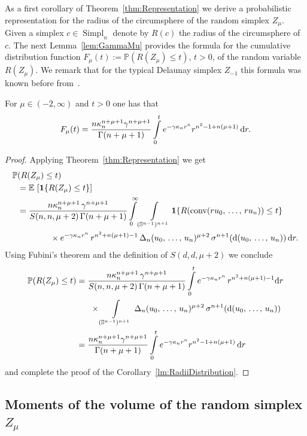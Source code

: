 \documentclass[10pt]{amsart}
\theoremstyle{definition}\newtheorem{defi}[theo]{Definition}\newtheorem{rema}[theo]{Remark}\newtheorem{exam}[theo]{Example}\newtheorem{exem}[theo]{Example}\newtheorem{nota}[theo]{Notation}
\newcommand{\Sp}{\mathbb S}
\newcommand{\EE}{\mathbb{E}\,}
\newcommand{\PP}{\mathbb{P}}
\newcommand{\dd}{{\rm d}}
\DeclareMathOperator{\Simpl}{Simpl}
\newcommand{\conv}{\mathop{\mathrm{conv}}\nolimits}
\begin{document}
As a first corollary of Theorem~\ref{thm:Representation} we derive a probabilistic representation for the radius of the circumsphere of the random simplex $Z_{\mu}$. Given a simplex $c\in \Simpl_n$ denote by $R(c)$ the radius of the circumsphere of $c$. The next Lemma~\ref{lem:GammaMu} provides the formula for the cumulative distribution function $F_{\mu}(t):=\PP(R(Z_\mu)\leq t)$, $t> 0$, of the random variable $R(Z_\mu)$. We remark that for the typical Delaunay simplex $Z_{-1}$ this formula was known before from~\cite{ENR17}.

\begin{coro}\label{lm:RadiiDistribution}
For $\mu\in(-2,\infty)$ and $t>0$ one has that
\[
F_{\mu}(t)=\frac{n\kappa_n^{n+\mu+1}\gamma^{n+\mu+1}}{\Gamma(n+\mu+1)}\int\limits_{0}^{t}e^{-\gamma\kappa_nr^n}r^{n^2-1+n(\mu+1)}\,\dd r.
\]
\end{coro}

\begin{proof}
Applying Theorem~\ref{thm:Representation} we get
\begin{align*}
\PP&(R(Z_\mu)\leq t)\\
&=\EE\left[{\bf 1}\{R(Z_\mu)\leq t\}\right]\\
&=\frac{n\kappa_n^{n+\mu+1}\,\gamma^{n+\mu+1}}{S(n,n,\mu+2)\,\Gamma(n+\mu+1)}\int\limits_0^\infty\int\limits_{(\Sp^{n-1})^{n+1}}{\bf 1}\{R(\conv(ru_0,\,\ldots,\,ru_n))\leq t\}\\
&\mkern70mu\times e^{-\gamma\kappa_nr^n}\,r^{n^2+n(\mu+1)-1}\,\Delta_n(u_0,\,\ldots,\,u_n)^{\mu+2}\,\sigma^{n+1}(\dd(u_0,\,\ldots,\,u_n))\,\dd r.
\end{align*}
Using Fubini's theorem and the definition of $S(d,d,\mu+2)$ we conclude
\begin{align*}
\PP(R(Z_\mu)\leq t)&=\frac{n\kappa_n^{n+\mu+1}\,\gamma^{n+\mu+1}}{S(n,n,\mu+2)\,\Gamma(n+\mu+1)}\int\limits_0^te^{-\gamma\kappa_nr^n}\,r^{n^2+n(\mu+1)-1}\dd r\\
&\mkern30mu \times \int\limits_{(\Sp^{n-1})^{n+1}}\,\Delta_n(u_0,\,\ldots,\,u_n)^{\mu+2}\,\sigma^{n+1}(\dd(u_0,\,\ldots,\,u_n))\\
&=\frac{n\kappa_n^{n+\mu+1}\gamma^{n+\mu+1}}{\Gamma(n+\mu+1)}\int\limits_{0}^{t}e^{-\gamma\kappa_nr^n}r^{n^2-1+n(\mu+1)}\,\dd r
\end{align*}
and complete the proof of the Corollary~\ref{lm:RadiiDistribution}.
\end{proof}



\subsection{Moments of the volume of the random simplex \texorpdfstring{$Z_\mu$}{Z mu}}
\end{document}
